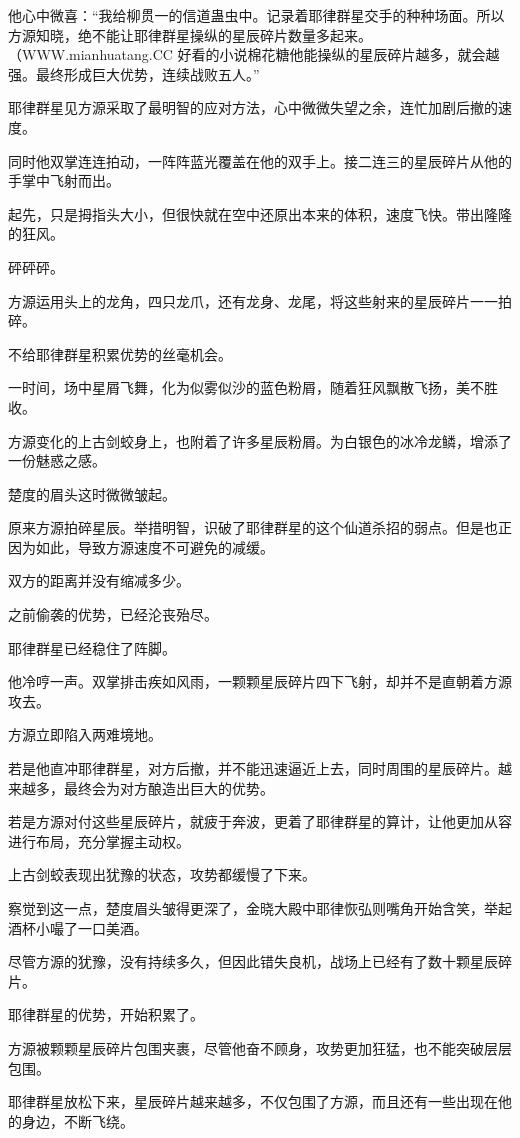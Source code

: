\begin{this_body}
他心中微喜：“我给柳贯一的信道蛊虫中。记录着耶律群星交手的种种场面。所以方源知晓，绝不能让耶律群星操纵的星辰碎片数量多起来。（WWW.mianhuatang.CC 好看的小说棉花糖他能操纵的星辰碎片越多，就会越强。最终形成巨大优势，连续战败五人。”

耶律群星见方源采取了最明智的应对方法，心中微微失望之余，连忙加剧后撤的速度。

同时他双掌连连拍动，一阵阵蓝光覆盖在他的双手上。接二连三的星辰碎片从他的手掌中飞射而出。

起先，只是拇指头大小，但很快就在空中还原出本来的体积，速度飞快。带出隆隆的狂风。

砰砰砰。

方源运用头上的龙角，四只龙爪，还有龙身、龙尾，将这些射来的星辰碎片一一拍碎。

不给耶律群星积累优势的丝毫机会。

一时间，场中星屑飞舞，化为似雾似沙的蓝色粉屑，随着狂风飘散飞扬，美不胜收。

方源变化的上古剑蛟身上，也附着了许多星辰粉屑。为白银色的冰冷龙鳞，增添了一份魅惑之感。

楚度的眉头这时微微皱起。

原来方源拍碎星辰。举措明智，识破了耶律群星的这个仙道杀招的弱点。但是也正因为如此，导致方源速度不可避免的减缓。

双方的距离并没有缩减多少。

之前偷袭的优势，已经沦丧殆尽。

耶律群星已经稳住了阵脚。

他冷哼一声。双掌排击疾如风雨，一颗颗星辰碎片四下飞射，却并不是直朝着方源攻去。

方源立即陷入两难境地。

若是他直冲耶律群星，对方后撤，并不能迅速逼近上去，同时周围的星辰碎片。越来越多，最终会为对方酿造出巨大的优势。

若是方源对付这些星辰碎片，就疲于奔波，更着了耶律群星的算计，让他更加从容进行布局，充分掌握主动权。

上古剑蛟表现出犹豫的状态，攻势都缓慢了下来。

察觉到这一点，楚度眉头皱得更深了，金晓大殿中耶律恢弘则嘴角开始含笑，举起酒杯小嘬了一口美酒。

尽管方源的犹豫，没有持续多久，但因此错失良机，战场上已经有了数十颗星辰碎片。

耶律群星的优势，开始积累了。

方源被颗颗星辰碎片包围夹裹，尽管他奋不顾身，攻势更加狂猛，也不能突破层层包围。

耶律群星放松下来，星辰碎片越来越多，不仅包围了方源，而且还有一些出现在他的身边，不断飞绕。


\end{this_body}
